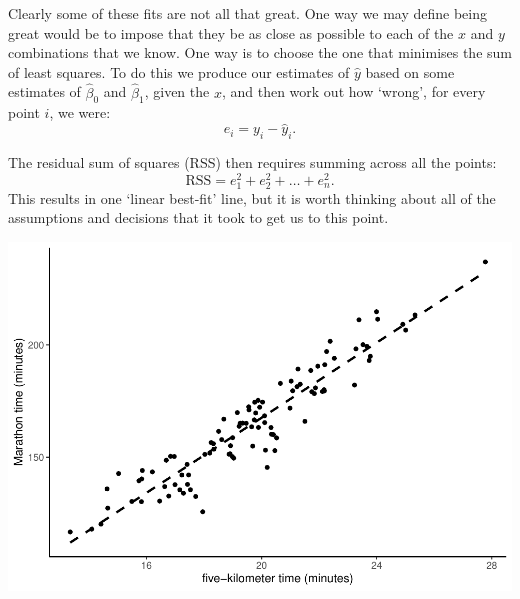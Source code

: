 \documentclass[
]{book}
\newenvironment{Shaded}{\begin{snugshade}}{\end{snugshade}}
\newcommand{\DataTypeTok}[1]{\textcolor[rgb]{0.13,0.29,0.53}{#1}}
\newcommand{\KeywordTok}[1]{\textcolor[rgb]{0.13,0.29,0.53}{\textbf{#1}}}
\newcommand{\NormalTok}[1]{#1}
\newcommand{\OperatorTok}[1]{\textcolor[rgb]{0.81,0.36,0.00}{\textbf{#1}}}
\newcommand{\OtherTok}[1]{\textcolor[rgb]{0.56,0.35,0.01}{#1}}
\newcommand{\StringTok}[1]{\textcolor[rgb]{0.31,0.60,0.02}{#1}}
\begin{document}
Clearly some of these fits are not all that great. One way we may define being great would be to impose that they be as close as possible to each of the \(x\) and \(y\) combinations that we know. One way is to choose the one that minimises the sum of least squares. To do this we produce our estimates of \(\hat{y}\) based on some estimates of \(\hat{\beta}_0\) and \(\hat{\beta}_1\), given the \(x\), and then work out how `wrong', for every point \(i\), we were:
\[ e_i = y_i - \hat{y}_i.\]

The residual sum of squares (RSS) then requires summing across all the points:
\[ \mbox{RSS} = e^2_1+ e^2_2 +\dots + e^2_n.\]
This results in one `linear best-fit' line, but it is worth thinking about all of the assumptions and decisions that it took to get us to this point.

\begin{Shaded}
\end{Shaded}

\includegraphics{telling_stories_with_data_files/figure-latex/unnamed-chunk-350-1.pdf}
\end{document}

